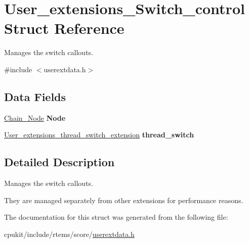 \hypertarget{structUser__extensions__Switch__control}{}\section{User\+\_\+extensions\+\_\+\+Switch\+\_\+control Struct Reference}
\label{structUser__extensions__Switch__control}


Manages the switch callouts.  




{\ttfamily \#include $<$userextdata.\+h$>$}

\subsection*{Data Fields}
\begin{DoxyCompactItemize}
\item 
\mbox{\label{structUser__extensions__Switch__control_a067e85ee77b279ea5412d3312fd39e36}} 
\mbox{\hyperlink{group__RTEMSScoreChain_ga0dd4bfcca1ac7f90de2842e447846d3d}{Chain\+\_\+\+Node}} {\bfseries Node}
\item 
\mbox{\label{structUser__extensions__Switch__control_aa2de4d8b2b8ce8c23099c359224a52ab}} 
\mbox{\hyperlink{group__RTEMSScoreUserExt_gac8250042e8749b455941bf4085d09fc5}{User\+\_\+extensions\+\_\+thread\+\_\+switch\+\_\+extension}} {\bfseries thread\+\_\+switch}
\end{DoxyCompactItemize}


\subsection{Detailed Description}
Manages the switch callouts. 

They are managed separately from other extensions for performance reasons. 

The documentation for this struct was generated from the following file\+:\begin{DoxyCompactItemize}
\item 
cpukit/include/rtems/score/\mbox{\hyperlink{userextdata_8h}{userextdata.\+h}}\end{DoxyCompactItemize}
